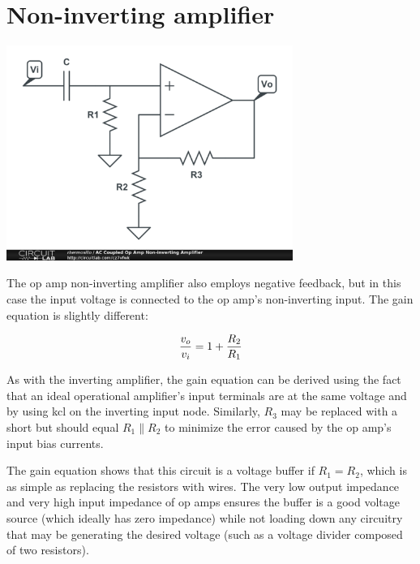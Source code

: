 \section{Non-inverting amplifier}
\begin{center}
\includegraphics[width=0.70\textwidth]{schematics/noninvertingopampamplifier.PNG}
\end{center}
The op amp non-inverting amplifier also employs negative feedback, but in this case the input voltage is connected to the op amp's non-inverting input. The gain equation is slightly different:

\textcolor{red}{
\begin{equation}
\frac{v_o}{v_i} = 1+\frac{R_2}{R_1}
\label{eq:noninvertingopampamplifier}
\end{equation}
}

As with the inverting amplifier, the gain equation can be derived using the fact that an ideal operational amplifier's input terminals are at the same voltage and by using \ac{kcl} on the inverting input node.
Similarly, $R_3$ may be replaced with a short but should equal $R_1 \parallel R_2$ to minimize the error caused by the op amp's input bias currents.

The gain equation shows that this circuit is a voltage buffer if $R_1 = R_2$, which is as simple as replacing the resistors with wires.
The very low output impedance and very high input impedance of op amps ensures the buffer is a good voltage source (which ideally has zero impedance) while not loading down any circuitry that may be generating the desired voltage (such as a voltage divider composed of two resistors).


